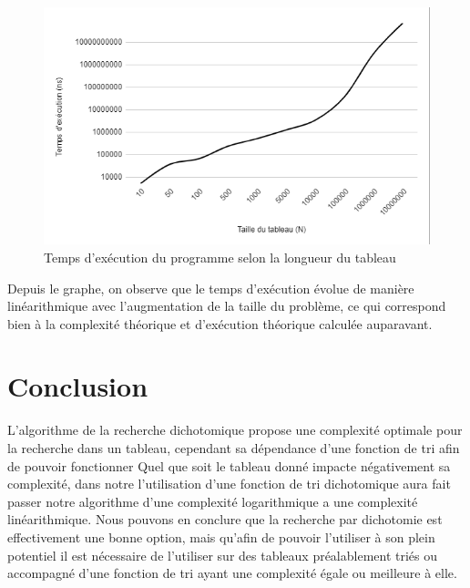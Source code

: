 \begin{figure}[H]
    \centering
        \includegraphics[scale=0.55]{./ressources/tempsexecutiondico.png}
        \caption{Temps d'exécution du programme selon la longueur du tableau}
    \label{fig:temps_exec_dico}
\end{figure}

\par
Depuis le graphe,  on observe que le temps d'exécution évolue de manière linéarithmique avec l'augmentation de la taille du problème, ce qui correspond bien à la complexité théorique et d’exécution théorique calculée auparavant. 

\section{Conclusion}
L'algorithme de la recherche dichotomique propose une complexité optimale pour la recherche dans un tableau, cependant sa dépendance d'une fonction de tri afin de pouvoir fonctionner Quel que soit le tableau donné impacte négativement sa complexité, dans notre l'utilisation d'une fonction de tri dichotomique aura fait passer notre algorithme d'une complexité logarithmique a une complexité linéarithmique. Nous pouvons en conclure que la recherche par dichotomie est effectivement une bonne option, mais qu'afin de pouvoir l'utiliser à son plein potentiel il est nécessaire de l'utiliser sur des tableaux préalablement triés ou accompagné d'une fonction de tri ayant une complexité égale ou meilleure à elle.